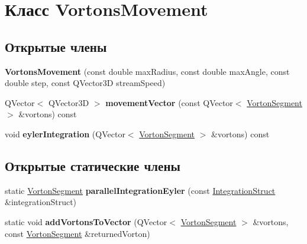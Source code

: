 \hypertarget{class_vortons_movement}{}\section{Класс Vortons\+Movement}
\label{class_vortons_movement}
\subsection*{Открытые члены}
\begin{DoxyCompactItemize}
\item 
\mbox{\label{class_vortons_movement_aacf8e006bb982de21f65a61f46ac7d66}} 
{\bfseries Vortons\+Movement} (const double max\+Radius, const double max\+Angle, const double step, const Q\+Vector3D stream\+Speed)
\item 
\mbox{\label{class_vortons_movement_a92aac84a212c10eb0baef4d0a5daaefa}} 
Q\+Vector$<$ Q\+Vector3D $>$ {\bfseries movement\+Vector} (const Q\+Vector$<$ \mbox{\hyperlink{class_vorton_segment}{Vorton\+Segment}} $>$ \&vortons) const
\item 
\mbox{\label{class_vortons_movement_a227634feb2be395471b15d132505f24e}} 
void {\bfseries eyler\+Integration} (Q\+Vector$<$ \mbox{\hyperlink{class_vorton_segment}{Vorton\+Segment}} $>$ \&vortons) const
\end{DoxyCompactItemize}
\subsection*{Открытые статические члены}
\begin{DoxyCompactItemize}
\item 
\mbox{\label{class_vortons_movement_a823223e3b3e0d7e2707b583d944ee745}} 
static \mbox{\hyperlink{class_vorton_segment}{Vorton\+Segment}} {\bfseries parallel\+Integration\+Eyler} (const \mbox{\hyperlink{struct_integration_struct}{Integration\+Struct}} \&integration\+Struct)
\item 
\mbox{\label{class_vortons_movement_a417520eca0af28f19c8fe7bc01152f93}} 
static void {\bfseries add\+Vortons\+To\+Vector} (Q\+Vector$<$ \mbox{\hyperlink{class_vorton_segment}{Vorton\+Segment}} $>$ \&vortons, const \mbox{\hyperlink{class_vorton_segment}{Vorton\+Segment}} \&returned\+Vorton)
\end{DoxyCompactItemize}
